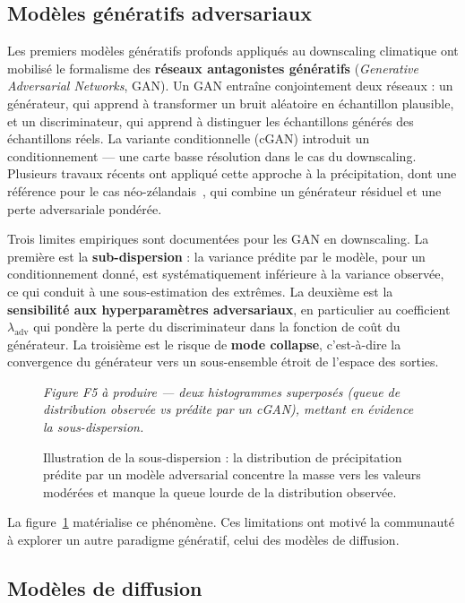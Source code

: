 \documentclass[14pt,a4paper,openany]{extreport}
\theoremstyle{definition}
\newcommand{\figplaceholder}[2][0.9\linewidth]{%
  \begin{tcolorbox}[width=#1,height=5cm,valign=center,colback=gray!8,colframe=gray!45,arc=2pt,boxrule=0.5pt]
    \centering\small\textit{#2}
  \end{tcolorbox}%
}
\begin{document}
\subsection{Modèles génératifs adversariaux}
\label{ssec:gan}

Les premiers modèles génératifs profonds appliqués au downscaling climatique ont mobilisé le formalisme des \textbf{réseaux antagonistes génératifs} (\emph{Generative Adversarial Networks}, GAN). Un GAN entraîne conjointement deux réseaux : un générateur, qui apprend à transformer un bruit aléatoire en échantillon plausible, et un discriminateur, qui apprend à distinguer les échantillons générés des échantillons réels. La variante conditionnelle (cGAN) introduit un conditionnement --- une carte basse résolution dans le cas du downscaling. Plusieurs travaux récents ont appliqué cette approche à la précipitation, dont une référence pour le cas néo-zélandais~\cite{rampal_cgan_2024}, qui combine un générateur résiduel et une perte adversariale pondérée.

Trois limites empiriques sont documentées pour les GAN en downscaling. La première est la \textbf{sub-dispersion} : la variance prédite par le modèle, pour un conditionnement donné, est systématiquement inférieure à la variance observée, ce qui conduit à une sous-estimation des extrêmes. La deuxième est la \textbf{sensibilité aux hyperparamètres adversariaux}, en particulier au coefficient $\lambda_{\mathrm{adv}}$ qui pondère la perte du discriminateur dans la fonction de coût du générateur. La troisième est le risque de \textbf{mode collapse}, c'est-à-dire la convergence du générateur vers un sous-ensemble étroit de l'espace des sorties.

\begin{figure}[ht]
  \centering
  \figplaceholder[0.85\linewidth]{Figure F5 à produire --- deux histogrammes superposés (queue de distribution observée vs prédite par un cGAN), mettant en évidence la sous-dispersion.}
  \caption{Illustration de la sous-dispersion : la distribution de précipitation prédite par un modèle adversarial concentre la masse vers les valeurs modérées et manque la queue lourde de la distribution observée.}
  \label{fig:subdispersion}
\end{figure}

La figure~\ref{fig:subdispersion} matérialise ce phénomène. Ces limitations ont motivé la communauté à explorer un autre paradigme génératif, celui des modèles de diffusion.

\subsection{Modèles de diffusion}
\label{ssec:diffusion}
\end{document}
